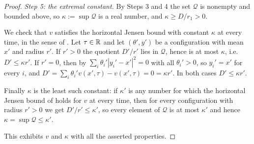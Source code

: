 \begin{proof}
\emph{Step 5: the extremal constant.}
By Steps 3 and 4 the set $\mathcal Q$ is nonempty and bounded above, so
$\kappa:=\sup\mathcal Q$ is a real number, and $\kappa\ge D/r_1>0$.

We check that $v$ satisfies the horizontal Jensen bound with constant $\kappa$
at every time, in the sense of . Let $\tau\in\mathbb{R}$ and let
$(\theta',y')$ be a configuration with mean $x'$ and radius $r'$. If $r'>0$ the
quotient $D'/r'$ lies in $\mathcal Q$, hence is at most $\kappa$, i.e.
$D'\le\kappa r'$. If $r'=0$, then by 
$\sum_i\theta_i'|y_i'-x'|^2=0$ with all $\theta_i'>0$, so $y_i'=x'$ for every
$i$, and $D'=\sum_i\theta_i'v(x',\tau)-v(x',\tau)=0=\kappa r'$. In both cases
$D'\le\kappa r'$.

Finally $\kappa$ is the least such constant: if $\kappa'$ is any number for
which the horizontal Jensen bound of  holds for $v$ at
every time, then for every configuration with radius $r'>0$ we get
$D'/r'\le\kappa'$, so every element of $\mathcal Q$ is at most $\kappa'$ and
hence $\kappa=\sup\mathcal Q\le\kappa'$.

This exhibits $v$ and $\kappa$ with all the asserted properties.
\end{proof}
